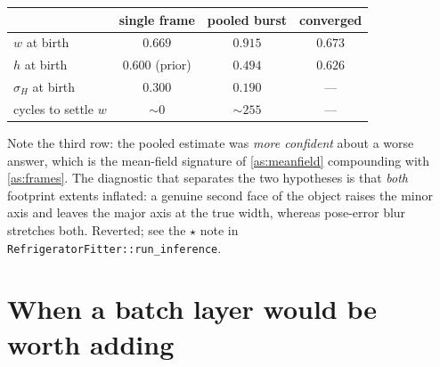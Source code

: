 \documentclass[11pt,a4paper]{report}
\theoremstyle{definition}   %
\begin{document}
\begin{center}
\begin{tabular}{@{}lccc@{}}
\toprule
& single frame & pooled burst & converged \\
\midrule
$w$ at birth        & $0.669$ & $\mathbf{0.915}$ & $0.673$ \\
$h$ at birth        & $0.600$ (prior) & $\mathbf{0.494}$ & $0.626$ \\
$\sigma_H$ at birth & $0.300$ & $0.190$ & --- \\
cycles to settle $w$ & $\sim 0$ & $\sim 255$ & --- \\
\bottomrule
\end{tabular}
\end{center}

\noindent
Note the third row: the pooled estimate was \emph{more confident} about a worse answer, which is
the mean-field signature of \ref{as:meanfield} compounding with \ref{as:frames}. The diagnostic
that separates the two hypotheses is that \emph{both} footprint extents inflated: a genuine
second face of the object raises the minor axis and leaves the major axis at the true width,
whereas pose-error blur stretches both. Reverted; see the $\star$ note in
\texttt{RefrigeratorFitter::run\_inference}.

\section{When a batch layer would be worth adding}
\label{sec:batch}
\end{document}
